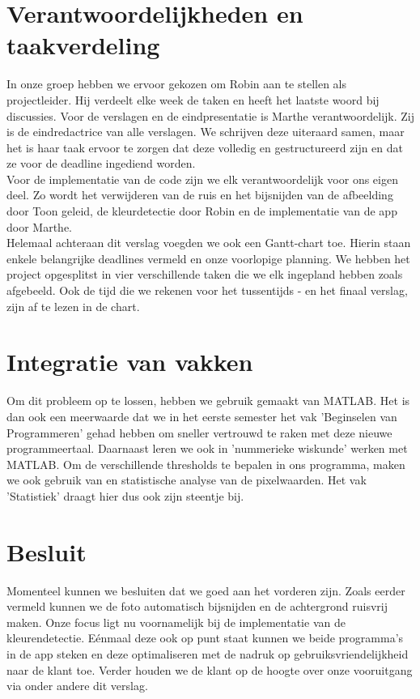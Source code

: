 \documentclass[a4paper,kulak]{kulakarticle}
\begin{document}
	\newpage
	\section{Verantwoordelijkheden en taakverdeling}		
		In onze groep hebben we ervoor gekozen om Robin aan te stellen als projectleider. Hij verdeelt elke week de taken en heeft het laatste woord bij discussies. 
		Voor de verslagen en de eindpresentatie is Marthe verantwoordelijk. Zij is de eindredactrice van alle verslagen. We schrijven deze uiteraard samen, maar het is haar taak ervoor te zorgen dat deze volledig en gestructureerd zijn en dat ze voor de deadline ingediend worden.\\
		Voor de implementatie van de code zijn we elk verantwoordelijk voor ons eigen deel. Zo wordt het verwijderen van de ruis en het bijsnijden van de afbeelding door Toon geleid, de kleurdetectie door Robin en de implementatie van de app door Marthe.\\
		Helemaal achteraan dit verslag voegden we ook een Gantt-chart toe. Hierin staan enkele belangrijke deadlines vermeld en onze voorlopige planning. We hebben het project opgesplitst in vier verschillende taken die we elk ingepland hebben zoals afgebeeld. Ook de tijd die we rekenen voor het tussentijds - en het finaal verslag, zijn af te lezen in de chart.
		
	\section{Integratie van vakken}
		Om dit probleem op te lossen, hebben we gebruik gemaakt van MATLAB. Het is dan ook een meerwaarde dat we in het eerste semester het vak 'Beginselen van Programmeren' gehad hebben om sneller vertrouwd te raken met deze nieuwe programmeertaal. Daarnaast leren we ook in 'nummerieke wiskunde' werken met MATLAB. Om de verschillende thresholds te bepalen in ons programma, maken we ook gebruik van en statistische analyse van de pixelwaarden. Het vak 'Statistiek' draagt hier dus ook zijn steentje bij.
	
	\section{Besluit}	
		Momenteel kunnen we besluiten dat we goed aan het vorderen zijn. Zoals eerder vermeld kunnen we de foto automatisch bijsnijden en de achtergrond ruisvrij maken. Onze focus ligt nu voornamelijk bij de implementatie van de kleurendetectie. Eénmaal deze ook op punt staat kunnen we beide programma's in de app steken en deze optimaliseren met de nadruk op gebruiksvriendelijkheid naar de klant toe. Verder houden we de klant op de hoogte over onze vooruitgang via onder andere dit verslag. 
		
\end{document}
